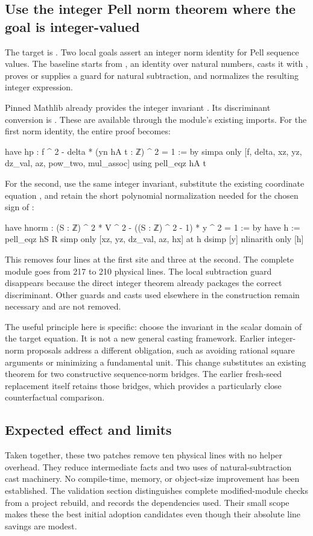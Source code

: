 \subsection{Use the integer Pell norm theorem where the goal is integer-valued}
The target is . Two local goals assert an integer norm identity for Pell sequence values. The baseline starts from , an identity over natural numbers, casts it with , proves or supplies a guard for natural subtraction, and normalizes the resulting integer expression.

Pinned Mathlib already provides the integer invariant . Its discriminant conversion is . These are available through the module's existing imports. For the first norm identity, the entire proof becomes:
\begin{lean}
have hp : f ^ 2 - delta * (yn hA t : ℤ) ^ 2 = 1 := by
  simpa only [f, delta, xz, yz, dz_val, az,
    pow_two, mul_assoc] using pell_eqz hA t
\end{lean}

For the second, use the same integer invariant, substitute the existing coordinate equation , and retain the short polynomial normalization needed for the chosen sign of :
\begin{lean}
have hnorm : (S : ℤ) ^ 2 * V ^ 2 -
    ((S : ℤ) ^ 2 - 1) * y ^ 2 = 1 := by
  have h := pell_eqz hS R
  simp only [xz, yz, dz_val, az, hx] at h
  dsimp [y]
  nlinarith only [h]
\end{lean}

This removes four lines at the first site and three at the second. The complete module goes from 217 to 210 physical lines. The local  subtraction guard disappears because the direct integer theorem already packages the correct discriminant. Other guards and casts used elsewhere in the construction remain necessary and are not removed.

The useful principle here is specific: choose the invariant in the scalar domain of the target equation. It is not a new general casting framework. Earlier integer-norm proposals address a different obligation, such as avoiding rational square arguments or minimizing a fundamental unit. This change substitutes an existing theorem for two constructive sequence-norm bridges. The earlier fresh-seed replacement itself retains those bridges, which provides a particularly close counterfactual comparison.

\subsection{Expected effect and limits}
Taken together, these two patches remove ten physical lines with no helper overhead. They reduce intermediate facts and two uses of natural-subtraction cast machinery. No compile-time, memory, or object-size improvement has been established. The validation section distinguishes complete modified-module checks from a project rebuild, and records the dependencies used. Their small scope makes these the best initial adoption candidates even though their absolute line savings are modest.
